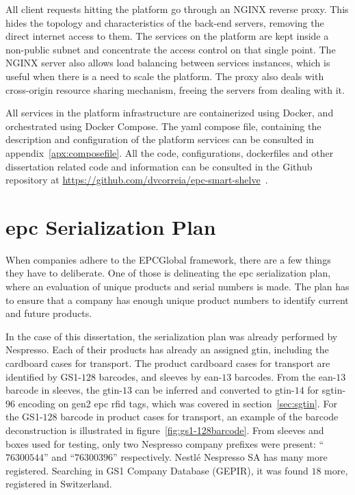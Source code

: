 All client requests hitting the platform go through an NGINX reverse proxy. This hides the topology and characteristics of the back-end servers, removing the direct internet access to them. The services on the platform are kept inside a non-public subnet and concentrate the access control on that single point. The NGINX server also allows load balancing between services instances, which is useful when there is a need to scale the platform. The proxy also deals with cross-origin resource sharing mechanism, freeing the servers from dealing with it.

All services in the platform infrastructure are containerized using Docker, and orchestrated using Docker Compose. The yaml compose file, containing the description and configuration of the platform services can be consulted in appendix~\ref{apx:composefile}.
All the code, configurations, dockerfiles and other dissertation related code and information can be consulted in the Github repository at \url{https://github.com/dvcorreia/epc-smart-shelve}~\cite{DvcorreiaEpcsmartshelve}.

\section{\acs{epc} Serialization Plan}

When companies adhere to the EPCGlobal framework, there are a few things they have to deliberate.
One of those is delineating the \acs{epc} serialization plan, where an evaluation of unique products and serial numbers is made.
The plan has to ensure that a company has enough unique product numbers to identify current and future products.

In the case of this dissertation, the serialization plan was already performed by Nespresso.
Each of their products has already an assigned \ac{gtin}, including the cardboard cases for transport.
The product cardboard cases for transport are identified by GS1-$128$ barcodes, and sleeves by \acs{ean}-$13$ barcodes.
From the \acs{ean}-$13$ barcode in sleeves, the \acs{gtin}-$13$ can be inferred and converted to \acs{gtin}-$14$ for \ac{sgtin}-$96$ encoding on \ac{gen2} \ac{epc} \acs{rfid} tags, which was covered in section~\ref{sec:sgtin}.
For the GS1-$128$ barcode in product cases for transport, an example of the barcode deconstruction is illustrated in figure~\ref{fig:gs1-128barcode}.
From sleeves and boxes used for testing, only two Nespresso company prefixes were present: ``$76300544$'' and ``$76300396$'' respectively. Nestlé Nespresso SA has many more registered. Searching in GS1 Company Database (GEPIR), it was found $18$ more, registered in Switzerland.

